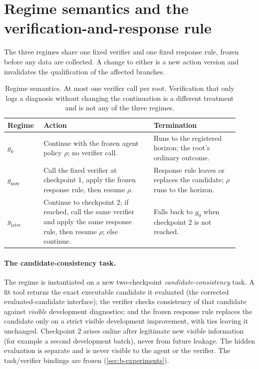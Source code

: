 \section{Regime semantics and the verification-and-response rule}
\label{sec:b-regimes}

The three regimes share one fixed verifier and one fixed response rule, frozen
before any data are collected.  A change to either is a new action version and
invalidates the qualification of the affected branches.

\begin{table}[t]
\centering
\small
\setlength{\tabcolsep}{4pt}
\begin{tabular}{@{}p{0.14\linewidth}p{0.44\linewidth}p{0.34\linewidth}@{}}
\toprule
Regime & Action & Termination \\
\midrule
$g_0$ & Continue with the frozen agent policy $\rho$; no verifier call. & Runs to the registered horizon; the root's ordinary outcome. \\
$g_{\mathrm{now}}$ & Call the fixed verifier at checkpoint 1, apply the frozen response rule, then resume $\rho$. & Response rule leaves or replaces the candidate; $\rho$ runs to the horizon. \\
$g_{\mathrm{later}}$ & Continue to checkpoint 2; if reached, call the same verifier and apply the same response rule, then resume $\rho$; else continue. & Falls back to $g_0$ when checkpoint 2 is not reached. \\
\bottomrule
\end{tabular}
\caption{Regime semantics.  At most one verifier call per root.  Verification
that only logs a diagnosis without changing the continuation is a different
treatment and is not any of the three regimes.}
\label{tab:option-boundaries}
\end{table}

\paragraph{The candidate-consistency task.}
The regime is instantiated on a new two-checkpoint \emph{candidate-consistency}
task.  A fit tool returns the exact executable candidate it evaluated (the
corrected evaluated-candidate interface); the verifier checks consistency of
that candidate against \emph{visible} development diagnostics; and the frozen
response rule replaces the candidate only on a strict visible development
improvement, with ties leaving it unchanged.  Checkpoint 2 arises online after
legitimate new visible information (for example a second development batch),
never from future leakage.  The hidden evaluation is separate and is never
visible to the agent or the verifier.  The task/verifier bindings are frozen
(\cref{sec:b-experiments}).

